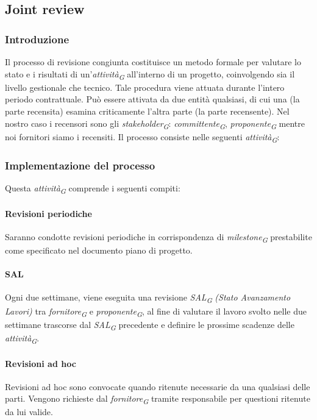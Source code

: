 \subsection{Joint review} 

\subsubsection{Introduzione}
Il processo di revisione congiunta costituisce un metodo formale per valutare lo stato e i risultati di un'\textit{attività}\textsubscript{\textit{G}} all'interno di un progetto, coinvolgendo sia il livello gestionale che tecnico. Tale procedura viene attuata durante l'intero periodo contrattuale. Può essere attivata da due entità qualsiasi, di cui una (la parte recensita) esamina criticamente l'altra parte (la parte recensente).
Nel nostro caso i recensori sono gli \textit{stakeholder}\textsubscript{\textit{G}}: \textit{committente}\textsubscript{\textit{G}}, \textit{proponente}\textsubscript{\textit{G}} mentre noi fornitori siamo i recensiti. 
Il processo consiste nelle seguenti \textit{attività}\textsubscript{\textit{G}}: 

\subsubsection{Implementazione del processo}
Questa \textit{attività}\textsubscript{\textit{G}} comprende i seguenti compiti: 

\paragraph{Revisioni periodiche}
Saranno condotte revisioni periodiche in corrispondenza di \textit{milestone}\textsubscript{\textit{G}} prestabilite come specificato nel documento piano di progetto. 

\paragraph{SAL}
Ogni due settimane, viene eseguita una revisione \textit{SAL}\textsubscript{\textit{G}} \textit{(Stato Avanzamento Lavori)} tra \textit{fornitore}\textsubscript{\textit{G}} e \textit{proponente}\textsubscript{\textit{G}}, al fine di valutare il lavoro svolto nelle due settimane trascorse dal \textit{SAL}\textsubscript{\textit{G}} precedente e definire le prossime scadenze delle \textit{attività}\textsubscript{\textit{G}}. 

\paragraph{Revisioni ad hoc}
Revisioni ad hoc sono convocate quando ritenute necessarie da una qualsiasi delle parti.
Vengono richieste dal \textit{fornitore}\textsubscript{\textit{G}} tramite responsabile per questioni ritenute da lui valide. 

